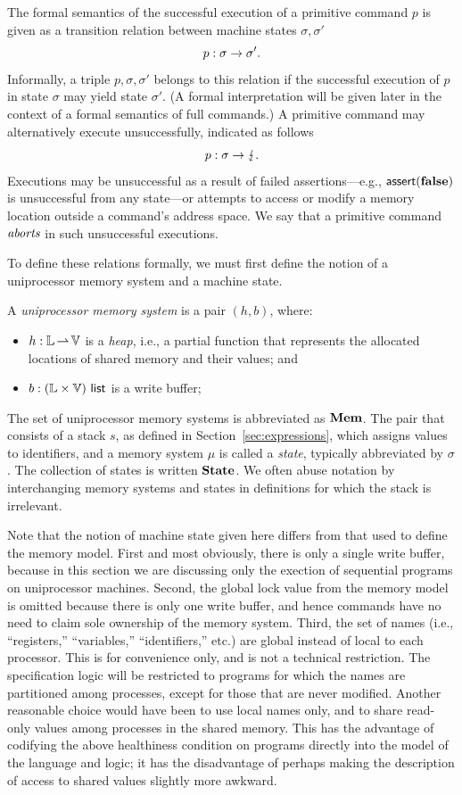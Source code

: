 \documentclass[11pt]{report}         %
\begin{document}
The formal semantics of the successful execution of a primitive command $p$ is given as a transition relation between machine states $\sigma,\sigma'$ \[ p : \sigma \rightarrow \sigma'. \] Informally, a triple $p,\sigma,\sigma'$ belongs to this relation if the successful execution of $p$ in state $\sigma$ may yield state $\sigma'$. (A formal interpretation will be given later in the context of a formal semantics of full commands.) A primitive command may alternatively execute unsuccessfully, indicated as follows \[ p : \sigma \rightarrow \lightning. \] Executions may be unsuccessful as a result of failed assertions---e.g., $\operatorname{\mathsf{assert}}(\mathbf{false})$ is unsuccessful from any state---or attempts to access or modify a memory location outside a command's address space. We say that a primitive command $\emph{aborts}$ in such unsuccessful executions. 

To define these relations formally, we must first define the notion of a uniprocessor memory system and a machine state. 

\begin{definition}
A \emph{uniprocessor memory system} is a pair $(h,b)$, where: \begin{itemize}
    \item $h : \mathbb{L} \operatorname{\rightharpoonup} \mathbb{V}$ is a \emph{heap}, i.e., a partial function that represents the allocated locations of shared memory and their values; and 
    \item $b : (\mathbb{L} \times \mathbb{V})~\mathsf{list}$ is a write buffer;
\end{itemize}
\end{definition} 
The set of uniprocessor memory systems is abbreviated as $\mathbf{Mem}$.
The pair that consists of a stack $s$, as defined in Section~\ref{sec:expressions}, which assigns values to identifiers, and a memory system $\mu$ is called a \emph{state}, typically abbreviated by $\sigma$. The collection of states is written $\mathbf{State}$. We often abuse notation by interchanging memory systems and states in definitions for which the stack is irrelevant. 

Note that the notion of machine state given here differs from that used to define the memory model. First and most obviously, there is only a single write buffer, because in this section we are discussing only the exection of sequential programs on uniprocessor machines. Second, the global lock value from the memory model is omitted because there is only one write buffer, and hence commands have no need to claim sole ownership of the memory system. Third, the set of names (i.e., ``registers,'' ``variables,'' ``identifiers,'' etc.) are global instead of local to each processor. This is for convenience only, and is not a technical restriction. The specification logic will be restricted to programs for which the names are partitioned among processes, except for those that are never modified. Another reasonable choice would have been to use local names only, and to share read-only values among processes in the shared memory. This has the advantage of codifying the above healthiness condition on programs directly into the model of the language and logic; it has the disadvantage of perhaps making the description of access to shared values slightly more awkward. 
\end{document}
